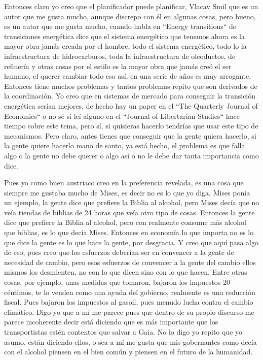 Entonces claro yo creo que el planificador puede planificar, Vlacav Smil que es un autor que me gusta mucho, aunque discrepo con él en algunas cosas, pero bueno, es un autor que me gusta mucho, cuando habla en ``Energy transitions`` de transiciones energética dice que el sistema energético que tenemos ahora es la mayor obra jamás creada por el hombre, todo el sistema energético, todo lo la infraestructura de hidrocarburos, toda la infraestructura de oleoductos, de refinería y otras cosas por el estilo es la mayor obra que jamás creó el ser humano, el querer cambiar todo eso así, en una serie de años es muy arrogante. Entonces tiene muchos problemas y tantos problemas repito que son derivados de la coordinación. Yo creo que en sistemas de mercado para conseguir la transición energética serían mejores, de hecho hay un paper en el ``The Quarterly Journal of Economics`` o no sé si leí alguno en el ``Journal of Libertarian Studies`` hace tiempo sobre este tema, pero sí, si quisieras hacerlo tendrías que usar este tipo de mecanismos. Pero claro, antes tienes que conseguir que la gente quiera hacerlo, si la gente quiere hacerlo mano de santo, ya está hecho, el problema es que falla algo o la gente no debe querer o algo así o no le debe dar tanta importancia como dice.

Pues yo como buen austriaco creo en la preferencia revelada, es una cosa que siempre me gustaba mucho de Mises, es decir no es lo que yo diga, Mises ponía un ejemplo, la gente dice que prefiere la Biblia al alcohol, pero Mises decía que no veía tiendas de biblias de 24 horas que veía otro tipo de cosas. Entonces la gente dice que prefiere la Biblia al alcohol, pero con realmente consume más alcohol que biblias, es lo que decía Mises. Entonces en economía lo que importa no es lo que dice la gente es lo que hace la gente, por desgracia. Y creo que aquí pasa algo de eso, pues creo que los esfuerzos deberían ser en convencer a la gente de necesidad de cambio, pero esos esfuerzos de convencer a la gente del cambio ellos mismos los desmienten, no con lo que dicen sino con lo que hacen. Entre otras cosas, por ejemplo, unas medidas que tomaron, bajaron los impuestos 20 céntimos, te lo venden como una ayuda del gobierno, realmente es una reducción fiscal. Pues bajaron los impuestos al gasoil, pues menudo lucha contra el cambio climático. Digo yo que a mí me parece pues que dentro de su propio discurso me parece incoherente decir está diciendo que es más importante que los transportistas estén contentos que salvar a Gaia. No lo digo yo repito que yo asumo, están diciendo ellos, o sea a mí me gusta que mis gobernantes como decía con el alcohol piensen en el bien común y piensen en el futuro de la humanidad.

